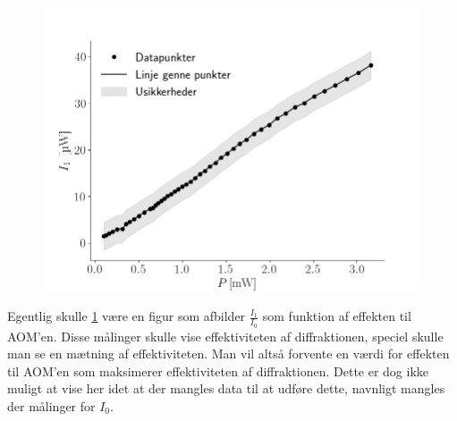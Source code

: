 \documentclass[main]{subfiles}
\begin{document}
\begin{figure}[H]
    \centering
    \includegraphics[width=\linewidth]{tegninger/graf2.png}
    \caption{}
    \label{fig:graf2}
\end{figure}
Egentlig skulle \cref{fig:graf2} være en figur som afbilder $\frac{I_1}{I_0}$ som funktion af effekten til AOM'en. Disse målinger skulle vise effektiviteten af diffraktionen, speciel skulle man se en mætning af effektiviteten. Man vil altså forvente en værdi for effekten til AOM'en som maksimerer effektiviteten af diffraktionen. Dette er dog ikke muligt at vise her idet at der mangles data til at udføre dette, navnligt mangles der målinger for $I_0$.  
\end{document}
